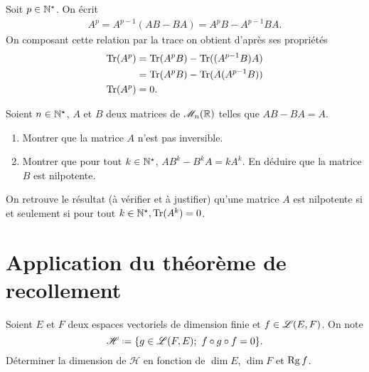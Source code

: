 \begin{solution}
    Soit $p \in \mathbb{N}^\star$. On écrit
    \begin{align*}
        A^p = A^{p-1}(AB-BA) = A^pB - A^{p-1}BA.
    \end{align*}
    On composant cette relation par la trace on obtient d'après ses propriétés
    \begin{align*}
        \mathrm{Tr}(A^p) &= \mathrm{Tr}(A^pB) - \mathrm{Tr}((A^{p-1}B)A) \\
        &= \mathrm{Tr}(A^pB) - \mathrm{Tr}(A(A^{p-1}B)) \\
        \mathrm{Tr}(A^p) &= 0.
    \end{align*}
\end{solution}

\begin{exercice} 
    Soient $n \in \mathbb{N}^\star$, $A$ et $B$ deux matrices de $\mathscr{M}_n(\mathbb{R})$ telles que $AB - BA = A.$
    \begin{enumerate}
        \item Montrer que la matrice $A$ n'est pas inversible.
        \item Montrer que pour tout $k \in \mathbb{N}^\star$, $AB^k - B^k A = k A^k$. En déduire que la matrice $B$ est nilpotente. 
    \end{enumerate}
\end{exercice}

\begin{remarque}
    On retrouve le résultat (à vérifier et à justifier) qu'une matrice $A$ est nilpotente si et seulement si pour tout $k \in \mathbb{N}^\star, \mathrm{Tr}(A^k) = 0$.
\end{remarque}


\section{Application du théorème de recollement}

\begin{exercice}
    Soient $E$ et $F$ deux espaces vectoriels de dimension finie et $f \in \mathscr{L}(E, F)$. On note 
    $$\mathscr{H} \defeq \{ g \in \Endo(F, E);\ f \circ g \circ f = 0\}.$$ 
    Déterminer la dimension de $\mathscr{H}$ en fonction de $\dim E$, $\dim F$ et $\mathrm{Rg}\, f$.
\end{exercice}



